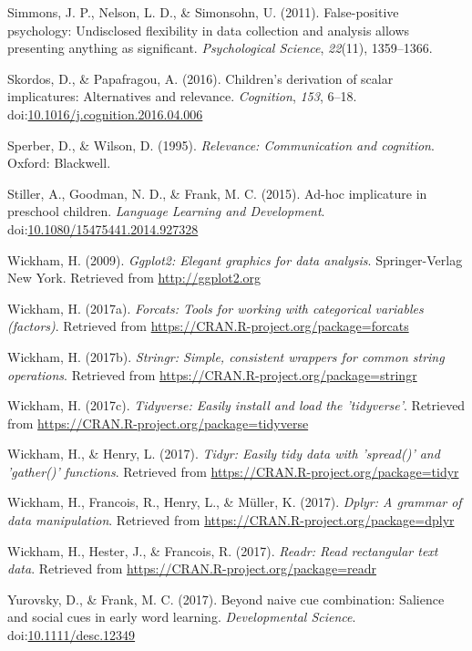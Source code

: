 \documentclass[mask,man]{apa6}
\begin{document}
\hypertarget{ref-simmons2011false}{}
Simmons, J. P., Nelson, L. D., \& Simonsohn, U. (2011). False-positive
psychology: Undisclosed flexibility in data collection and analysis
allows presenting anything as significant. \emph{Psychological Science},
\emph{22}(11), 1359--1366.

\hypertarget{ref-skordos2016}{}
Skordos, D., \& Papafragou, A. (2016). Children's derivation of scalar
implicatures: Alternatives and relevance. \emph{Cognition}, \emph{153},
6--18.
doi:\href{https://doi.org/10.1016/j.cognition.2016.04.006}{10.1016/j.cognition.2016.04.006}

\hypertarget{ref-sperber1986}{}
Sperber, D., \& Wilson, D. (1995). \emph{Relevance: Communication and
cognition}. Oxford: Blackwell.

\hypertarget{ref-stiller2015}{}
Stiller, A., Goodman, N. D., \& Frank, M. C. (2015). Ad-hoc implicature
in preschool children. \emph{Language Learning and Development}.
doi:\href{https://doi.org/10.1080/15475441.2014.927328}{10.1080/15475441.2014.927328}

\hypertarget{ref-R-ggplot2}{}
Wickham, H. (2009). \emph{Ggplot2: Elegant graphics for data analysis}.
Springer-Verlag New York. Retrieved from \url{http://ggplot2.org}

\hypertarget{ref-R-forcats}{}
Wickham, H. (2017a). \emph{Forcats: Tools for working with categorical
variables (factors)}. Retrieved from
\url{https://CRAN.R-project.org/package=forcats}

\hypertarget{ref-R-stringr}{}
Wickham, H. (2017b). \emph{Stringr: Simple, consistent wrappers for
common string operations}. Retrieved from
\url{https://CRAN.R-project.org/package=stringr}

\hypertarget{ref-R-tidyverse}{}
Wickham, H. (2017c). \emph{Tidyverse: Easily install and load the
'tidyverse'}. Retrieved from
\url{https://CRAN.R-project.org/package=tidyverse}

\hypertarget{ref-R-tidyr}{}
Wickham, H., \& Henry, L. (2017). \emph{Tidyr: Easily tidy data with
'spread()' and 'gather()' functions}. Retrieved from
\url{https://CRAN.R-project.org/package=tidyr}

\hypertarget{ref-R-dplyr}{}
Wickham, H., Francois, R., Henry, L., \& Müller, K. (2017). \emph{Dplyr:
A grammar of data manipulation}. Retrieved from
\url{https://CRAN.R-project.org/package=dplyr}

\hypertarget{ref-R-readr}{}
Wickham, H., Hester, J., \& Francois, R. (2017). \emph{Readr: Read
rectangular text data}. Retrieved from
\url{https://CRAN.R-project.org/package=readr}

\hypertarget{ref-yurovsky2017}{}
Yurovsky, D., \& Frank, M. C. (2017). Beyond naive cue combination:
Salience and social cues in early word learning. \emph{Developmental
Science}.
doi:\href{https://doi.org/10.1111/desc.12349}{10.1111/desc.12349}
\end{document}
